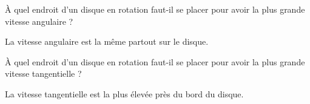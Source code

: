 \begin{exercise}
    À quel endroit d'un disque en rotation faut-il se placer pour avoir la plus grande vitesse angulaire ?
\end{exercise}
\begin{solution}
    La vitesse angulaire est la même partout sur le disque.
\end{solution}

\begin{exercise}
    À quel endroit d'un disque en rotation faut-il se placer pour avoir la plus grande vitesse tangentielle ?
\end{exercise}
\begin{solution}
    La vitesse tangentielle est la plus élevée près du bord du disque.
\end{solution}

